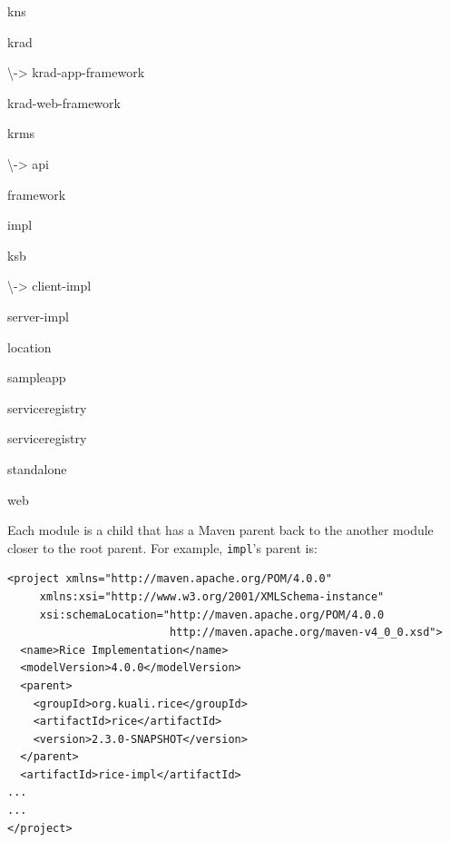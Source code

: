 \documentclass[12pt,notitlepage]{article}
\begin{document}
{\begin{list}{|->}{\setlength{\leftmargin}{1em}}
\begin{list}{|->}{\setlength{\leftmargin}{1em}}
  \item kns
  \item krad
    \begin{list}{|->}{\setlength{\leftmargin}{0.5em}}
    \item[\textbackslash->] krad-app-framework
    \item krad-web-framework
    \end{list}
  \item krms
    \begin{list}{|->}{\setlength{\leftmargin}{0.5em}}
    \item[\textbackslash->] api
    \item framework
    \item impl
    \end{list}
  \item ksb
    \begin{list}{|->}{\setlength{\leftmargin}{0.5em}}
    \item[\textbackslash->] client-impl
    \item server-impl
    \end{list} 
  \item location
  \item sampleapp
  \item serviceregistry
  \item serviceregistry
  \item standalone
  \item web
  \end{list}
\end{list}}

Each module is a child that has a Maven parent back to the another module closer to the root parent. For example, \texttt{impl}'s parent is:
  \begin{verbatim}
<project xmlns="http://maven.apache.org/POM/4.0.0" 
     xmlns:xsi="http://www.w3.org/2001/XMLSchema-instance" 
     xsi:schemaLocation="http://maven.apache.org/POM/4.0.0 
                         http://maven.apache.org/maven-v4_0_0.xsd">
  <name>Rice Implementation</name>
  <modelVersion>4.0.0</modelVersion>
  <parent>
    <groupId>org.kuali.rice</groupId>
    <artifactId>rice</artifactId>
    <version>2.3.0-SNAPSHOT</version>
  </parent>
  <artifactId>rice-impl</artifactId>
...
...
</project>
  \end{verbatim}
\end{document}
